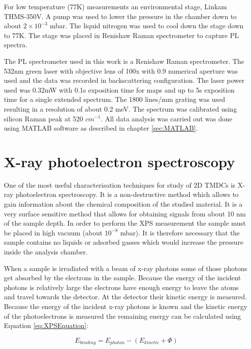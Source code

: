 For low temperature (77K) measurements an environmental stage, Linkam THMS-350V. A pump was used to lower the pressure in the chamber down to about $2 \times 10^{-3}$ mbar. The liquid nitrogen was used to cool down the stage down to 77K. The stage was placed in Renishaw Raman spectrometer to capture PL spectra.

The PL spectrometer used in this work is a Renishaw Raman spectrometer. The 532nm green laser with objective lens of 100x with 0.9 numerical aperture was used and the data was recorded in backscattering configuration. The laser power used was 0.32mW with 0.1s exposition time for maps and up to 5s exposition time for a single extended spectrum. The 1800 lines/mm grating was used resulting in a resolution of about 0.2 meV. The spectrum was calibrated using silicon Raman peak at 520 $cm^{-1}$. All data analysis was carried out was done using MATLAB software as described in chapter \ref{sec:MATLAB}.

\section{X-ray photoelectron spectroscopy}

One of the most useful characterisation techniques for study of 2D TMDCs is X-ray photoelectron spectroscopy. It is a non-destructive method which allows to gain information about the chemical composition of the studied material. It is a very surface sensitive method that allows for obtaining signals from about 10 nm of the sample depth. In order to perform the XPS measurement the sample must be placed in high vacuum (about $10^{-8}$ mbar). It is therefore necessary that the sample contains no liquids or adsorbed gasses which would increase the pressure inside the analysis chamber. 

When a sample is irradiated with a beam of x-ray photons some of those photons get absorbed by the electrons in the sample. Because the energy of the incident photons is relatively large the electrons have enough energy to leave the atoms and travel towards the detector. At the detector their kinetic energy is measured. Because the energy of the incident x-ray photons is known and the kinetic energy of the photoelectrons is measured the remaining energy can be calculated using Equation \ref{eq:XPSEquation}:

\begin{equation}
E_{binding}  = E_{photon} - (E_{kinetic} + \Phi)
\label{eq:XPSEquation}
\end{equation}

